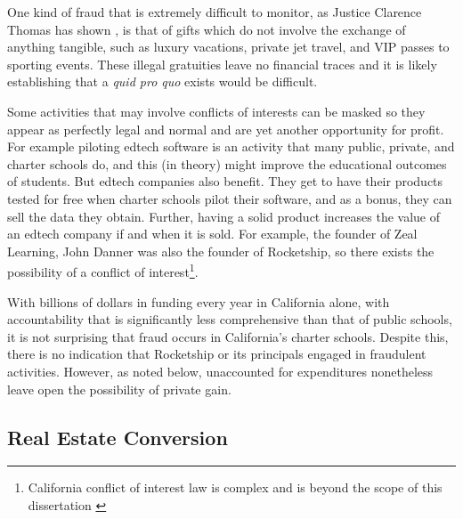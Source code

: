 One kind of fraud that is extremely difficult to monitor, as Justice Clarence Thomas has shown \parencite{Murphy.Mierjeski2023}, is that of gifts which do not involve the exchange of anything tangible, such as luxury vacations, private jet travel, and VIP passes to sporting events. These illegal gratuities leave no financial traces and it is likely establishing that a \textit{quid pro quo} exists would be difficult.

Some activities that may involve conflicts of interests can be masked so they appear as perfectly legal and normal and are yet another opportunity for profit. For example piloting edtech software is an activity that many public, private, and charter schools do, and this (in theory) might improve the educational outcomes of students. But edtech companies also benefit. They get to have their products tested for free when charter schools pilot their software, and as a bonus, they can sell the data they obtain. Further, having a solid product increases the value of an edtech company if and when it is sold. For example, the founder of Zeal Learning, John Danner was also the founder of Rocketship, so there exists the possibility of a conflict of interest\footnote{California conflict of interest law is complex and is beyond the scope of this dissertation \parencite{Chaney.etal2010}}.

With billions of dollars in funding every year in California alone, with accountability that is significantly less comprehensive than that of public schools, it is not surprising that fraud occurs in California's charter schools. Despite this, there is no indication that Rocketship or its principals engaged in fraudulent activities. However, as noted below, unaccounted for expenditures nonetheless leave open the possibility of private gain. 

\subsection{Real Estate Conversion}%
\label{sec:real-estate-conv}%

